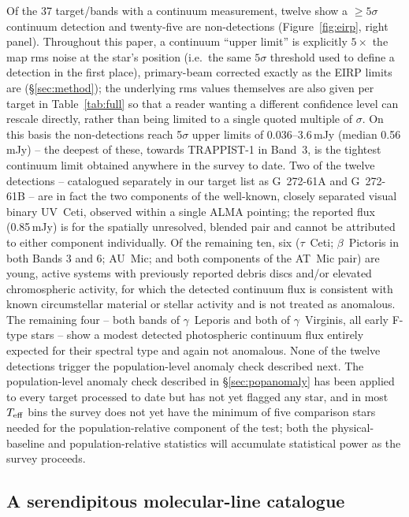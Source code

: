 \documentclass{openjournal}
\begin{document}
Of the 37 target/bands with a continuum measurement, twelve show a
$\geq5\sigma$ continuum detection and twenty-five are non-detections
(Figure~\ref{fig:eirp}, right panel). Throughout this paper, a continuum
``upper limit'' is explicitly $5\times$ the map rms noise at the star's
position (i.e.\ the same $5\sigma$ threshold used to define a detection
in the first place), primary-beam corrected exactly as the EIRP limits
are (\S\ref{sec:method}); the underlying rms values themselves are also
given per target in Table~\ref{tab:full} so that a reader wanting a
different confidence level can rescale directly, rather than being
limited to a single quoted multiple of $\sigma$. On this basis the
non-detections reach 5$\sigma$ upper limits of 0.036--3.6\,mJy (median
0.56\,mJy) -- the deepest of these, towards TRAPPIST-1 in Band~3, is
the tightest continuum limit obtained anywhere in the survey to date.
Two of the twelve detections -- catalogued separately in our target list
as G~272-61A and G~272-61B -- are in fact the two components of the
well-known, closely separated visual binary UV~Ceti, observed within a
single ALMA pointing; the reported flux (0.85\,mJy) is for the spatially
unresolved, blended pair and cannot be attributed to either component
individually. Of the remaining ten, six ($\tau$~Ceti; $\beta$~Pictoris in
both Bands 3 and 6; AU~Mic; and both components of the AT~Mic pair) are
young, active systems with previously reported debris discs and/or
elevated chromospheric activity, for which the detected continuum flux
is consistent with known circumstellar material or stellar activity and
is not treated as anomalous. The remaining four -- both bands of
$\gamma$~Leporis and both of $\gamma$~Virginis, all early F-type stars --
show a modest detected photospheric continuum flux entirely expected for
their spectral type and again not anomalous. None of the twelve
detections trigger the population-level anomaly check described next.
The population-level anomaly check described in
\S\ref{sec:popanomaly} has been applied to every target processed to
date but has not yet flagged any star, and in most $T_{\rm eff}$ bins the
survey does not yet have the minimum of five comparison stars needed for
the population-relative component of the test; both the physical-baseline
and population-relative statistics will accumulate statistical power as
the survey proceeds.

\subsection{A serendipitous molecular-line catalogue}
\label{sec:linecatalogue}
\end{document}
